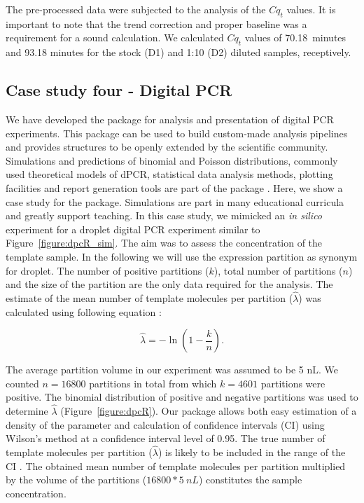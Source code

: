 The pre-processed data were subjected to the analysis of the $Cq_{t}$ values. 
It is important to note that the trend correction and proper baseline was a 
requirement for a sound calculation. We calculated $Cq_{t}$ values of 
70.18~minutes and 93.18 minutes for the stock (D1) and 1:10 (D2) diluted 
samples, receptively.

\subsection{Case study four - Digital PCR}

We have developed the  package for analysis and presentation of 
digital PCR experiments. This package can be used to build 
custom-made analysis pipelines and provides structures to be openly extended by 
the scientific community. Simulations and predictions of binomial and Poisson 
distributions, commonly used theoretical models of dPCR, statistical data 
analysis methods, plotting facilities and report generation tools are part of 
the package \citep{pabinger_2014}. Here, we show a case study for the 
 package. Simulations are part in many educational curricula and 
greatly support teaching. In this case study, we mimicked an \textit{in silico} 
experiment for a droplet digital PCR experiment similar to Figure~\ref{figure:dpcR_sim}. 
The aim was to assess the concentration of the template sample. In the following 
we will use the expression partition as synonym for droplet. The number of 
positive partitions ($k$), total number of partitions ($n$) and the size of the 
partition are the only data required for the analysis. The estimate of the mean 
number of template molecules per partition ($\hat \lambda$) was calculated using 
following equation \citep{huggett_2013}:

\begin{equation}
\hat{\lambda} =  -\ln{(1 - \frac{k}{n})}.
\end{equation}

The average partition volume in our experiment was assumed to be 5 nL. We 
counted $n = 16800$ partitions in total from which $k = 4601$ partitions were 
positive. The binomial distribution of positive and negative partitions was used 
to determine $\hat \lambda$ (Figure~\ref{figure:dpcR}). Our package allows both 
easy estimation of a density of the parameter and calculation of confidence 
intervals (CI) using Wilson's method \citep{brown_2001} at a confidence interval 
level of 0.95. The true number of template molecules per partition ($\hat 
\lambda$) is likely to be included in the range of the CI \citep{milbury_2014}. 
The obtained mean number of template molecules per partition multiplied by the 
volume of the partitions ($ 16800 * 5~nL$) constitutes the sample concentration.

